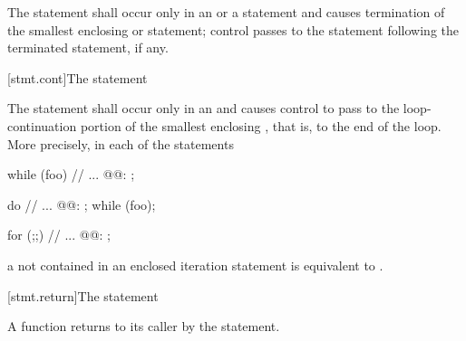 \pnum
The  statement shall occur only in an
%
%
 or a  statement and causes
termination of the smallest enclosing  or
 statement; control passes to the statement following the
terminated statement, if any.

[stmt.cont]{The  statement}%

\pnum
The
statement shall occur only in an
%
and causes control to pass to the loop-continuation portion of the
smallest enclosing , that is, to the end
of the loop. More precisely, in each of the statements

\begin{minipage}{.30\hsize}
\begin{codeblock}
while (foo) {
  {
    // ...
  }
@@: ;
}
\end{codeblock}
\end{minipage}
\begin{minipage}{.30\hsize}
\begin{codeblock}
do {
  {
    // ...
  }
@@: ;
} while (foo);
\end{codeblock}
\end{minipage}
\begin{minipage}{.30\hsize}
\begin{codeblock}
for (;;) {
  {
    // ...
  }
@@: ;
}
\end{codeblock}
\end{minipage}

a  not contained in an enclosed iteration statement is
equivalent to  .

[stmt.return]{The  statement}%
%
%

\pnum
A function returns to its caller by the  statement.

